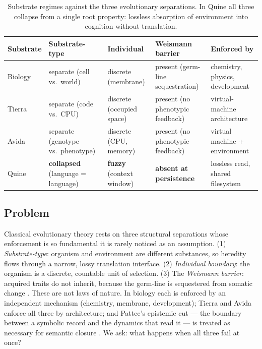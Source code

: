 \documentclass[letterpaper]{article}
\begin{document}
\begin{table}[t]
\centering
\scriptsize
\setlength{\tabcolsep}{4pt}
\renewcommand{\arraystretch}{1.15}
\begin{tabular}{p{}p{}p{}p{}p{}}
\hline
\textbf{Substrate} & \textbf{Substrate-type} & \textbf{Individual} & \textbf{Weismann barrier} & \textbf{Enforced by} \\
\hline
Biology & separate (cell vs.\ world) & discrete (membrane) & present (germ-line sequestration) & chemistry, physics, development \\
Tierra  & separate (code vs.\ CPU) & discrete (occupied space) & present (no phenotypic feedback) & virtual-machine architecture \\
Avida   & separate (genotype vs.\ phenotype) & discrete (CPU, memory) & present (no phenotypic feedback) & virtual machine + environment \\
Quine   & \textbf{collapsed} (language = language) & \textbf{fuzzy} (context window) & \textbf{absent at persistence} & lossless read, shared filesystem \\
\hline
\end{tabular}
\caption{Substrate regimes against the three evolutionary separations. In Quine all three collapse from a single root property: lossless absorption of environment into cognition without translation.}
\label{tab:coincidence}
\end{table}

\subsection{Problem}\label{problem}

Classical evolutionary theory rests on three structural separations
whose enforcement is so fundamental it is rarely noticed as an
assumption. (1) \emph{Substrate-type}: organism and environment are
different substances, so heredity flows through a narrow, lossy
translation interface. (2) \emph{Individual boundary}: the organism is a
discrete, countable unit of selection. (3) The \emph{Weismann barrier}:
acquired traits do not inherit, because the germ-line is sequestered
from somatic change \citep{weismann1893germ}. These are not laws of
nature. In biology each is enforced by an independent mechanism
(chemistry, membrane, development); Tierra \citep{ray1991approach} and
Avida \citep{ofria2004avida} enforce all three by architecture; and
Pattee's epistemic cut --- the boundary between a symbolic record and
the dynamics that read it --- is treated as necessary for semantic
closure \citep{pattee1995evolving}. We ask: what happens when all three
fail at once?
\end{document}

